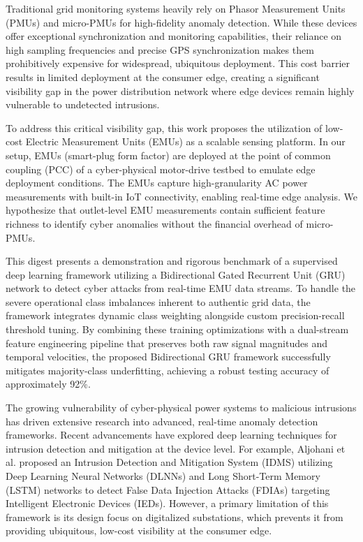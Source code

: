 \documentclass[conference,onecolumn,letterpaper,romanappendices,12pt,english,nofonttune]{IEEEtran}
\begin{document}
Traditional grid monitoring systems heavily rely on Phasor Measurement Units (PMUs) and micro-PMUs for high-fidelity anomaly detection. While these devices offer exceptional synchronization and monitoring capabilities, their reliance on high sampling frequencies and precise GPS synchronization makes them prohibitively expensive for widespread, ubiquitous deployment. This cost barrier results in limited deployment at the consumer edge, creating a significant visibility gap in the power distribution network where edge devices remain highly vulnerable to undetected intrusions.

To address this critical visibility gap, this work proposes the utilization of low-cost Electric Measurement Units (EMUs) as a scalable sensing platform. In our setup, EMUs (smart-plug form factor) are deployed at the point of common coupling (PCC) of a cyber-physical motor-drive testbed to emulate edge deployment conditions. The EMUs capture high-granularity AC power measurements with built-in IoT connectivity, enabling real-time edge analysis. We hypothesize that outlet-level EMU measurements contain sufficient feature richness to identify cyber anomalies without the financial overhead of micro-PMUs.

This digest presents a demonstration and rigorous benchmark of a supervised deep learning framework utilizing a Bidirectional Gated Recurrent Unit (GRU) network to detect cyber attacks from real-time EMU data streams. To handle the severe operational class imbalances inherent to authentic grid data, the framework integrates dynamic class weighting alongside custom precision-recall threshold tuning. By combining these training optimizations with a dual-stream feature engineering pipeline that preserves both raw signal magnitudes and temporal velocities, the proposed Bidirectional GRU framework successfully mitigates majority-class underfitting, achieving a robust testing accuracy of approximately 92\%.

The growing vulnerability of cyber-physical power systems to malicious intrusions has driven extensive research into advanced, real-time anomaly detection frameworks. Recent advancements have explored deep learning techniques for intrusion detection and mitigation at the device level. For example, Aljohani et al. \cite{aljohani2024} proposed an Intrusion Detection and Mitigation System (IDMS) utilizing Deep Learning Neural Networks (DLNNs) and Long Short-Term Memory (LSTM) networks to detect False Data Injection Attacks (FDIAs) targeting Intelligent Electronic Devices (IEDs). However, a primary limitation of this framework is its design focus on digitalized substations, which prevents it from providing ubiquitous, low-cost visibility at the consumer edge.
\end{document}
